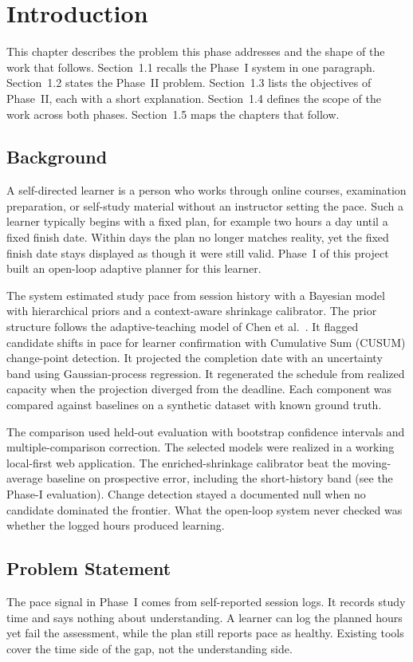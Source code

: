\chapter{Introduction}
This chapter describes the problem this phase addresses and the shape of the work that follows. Section~1.1 recalls the Phase~I system in one paragraph. Section~1.2 states the Phase~II problem. Section~1.3 lists the objectives of Phase~II, each with a short explanation. Section~1.4 defines the scope of the work across both phases. Section~1.5 maps the chapters that follow.

\section{Background}
A self-directed learner is a person who works through online courses, examination preparation, or self-study material without an instructor setting the pace. Such a learner typically begins with a fixed plan, for example two hours a day until a fixed finish date. Within days the plan no longer matches reality, yet the fixed finish date stays displayed as though it were still valid. Phase~I of this project built an open-loop adaptive planner for this learner.

The system estimated study pace from session history with a Bayesian model with hierarchical priors and a context-aware shrinkage calibrator. The prior structure follows the adaptive-teaching model of Chen et al.~\cite{chen2024}. It flagged candidate shifts in pace for learner confirmation with Cumulative Sum (CUSUM) change-point detection. It projected the completion date with an uncertainty band using Gaussian-process regression. It regenerated the schedule from realized capacity when the projection diverged from the deadline. Each component was compared against baselines on a synthetic dataset with known ground truth.

The comparison used held-out evaluation with bootstrap confidence intervals and multiple-comparison correction. The selected models were realized in a working local-first web application. The enriched-shrinkage calibrator beat the moving-average baseline on prospective error, including the short-history band (see the Phase-I evaluation). Change detection stayed a documented null when no candidate dominated the frontier. What the open-loop system never checked was whether the logged hours produced learning.

\section{Problem Statement}
The pace signal in Phase~I comes from self-reported session logs. It records study time and says nothing about understanding. A learner can log the planned hours yet fail the assessment, while the plan still reports pace as healthy. Existing tools cover the time side of the gap, not the understanding side.


